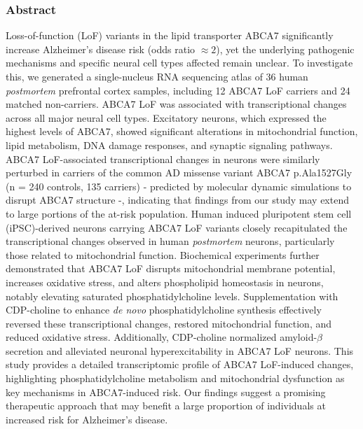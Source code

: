 \documentclass[12pt]{article}
\begin{document}
 
\begin{center}
\subsubsection*{Abstract}
\end{center}
\label{sec:abstract}
Loss-of-function (LoF) variants in the lipid transporter ABCA7 significantly increase Alzheimer's disease risk (odds ratio $\approx  2$), yet the underlying pathogenic mechanisms and specific neural cell types affected remain unclear. To investigate this, we generated a single-nucleus RNA sequencing atlas of 36 human \textit{postmortem} prefrontal cortex samples, including 12 ABCA7 LoF carriers and 24 matched non-carriers. ABCA7 LoF was associated with transcriptional changes across all major neural cell types. Excitatory neurons, which expressed the highest levels of ABCA7, showed significant alterations in mitochondrial function, lipid metabolism, DNA damage responses, and synaptic signaling pathways. ABCA7 LoF-associated transcriptional changes in neurons were similarly perturbed in carriers of the common AD missense variant ABCA7 p.Ala1527Gly (n = 240 controls, 135 carriers) - predicted by molecular dynamic simulations to disrupt ABCA7 structure -, indicating that findings from our study may extend to large portions of the at-risk population. Human induced pluripotent stem cell (iPSC)-derived neurons carrying ABCA7 LoF variants closely recapitulated the transcriptional changes observed in human \textit{postmortem} neurons, particularly those related to mitochondrial function. Biochemical experiments further demonstrated that ABCA7 LoF disrupts mitochondrial membrane potential, increases oxidative stress, and alters phospholipid homeostasis in neurons, notably elevating saturated phosphatidylcholine levels. Supplementation with CDP-choline to enhance \textit{de novo} phosphatidylcholine synthesis effectively reversed these transcriptional changes, restored mitochondrial function, and reduced oxidative stress. Additionally, CDP-choline normalized amyloid-$\beta$ secretion and alleviated neuronal hyperexcitability in ABCA7 LoF neurons. This study provides a detailed transcriptomic profile of ABCA7 LoF-induced changes, highlighting phosphatidylcholine metabolism and mitochondrial dysfunction as key mechanisms in ABCA7-induced risk. Our findings suggest a promising therapeutic approach that may benefit a large proportion of individuals at increased risk for Alzheimer's disease.

 \clearpage
\end{document}
